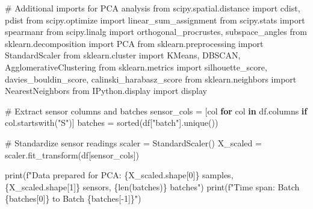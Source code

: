 \documentclass[
  letterpaper,
  DIV=11,
  numbers=noendperiod]{scrartcl}
\newenvironment{Shaded}{\begin{snugshade}}{\end{snugshade}}
\newcommand{\BuiltInTok}[1]{\textcolor[rgb]{0.00,0.23,0.31}{#1}}
\newcommand{\CommentTok}[1]{\textcolor[rgb]{0.37,0.37,0.37}{#1}}
\newcommand{\ControlFlowTok}[1]{\textcolor[rgb]{0.00,0.23,0.31}{\textbf{#1}}}
\newcommand{\DecValTok}[1]{\textcolor[rgb]{0.68,0.00,0.00}{#1}}
\newcommand{\ImportTok}[1]{\textcolor[rgb]{0.00,0.46,0.62}{#1}}
\newcommand{\KeywordTok}[1]{\textcolor[rgb]{0.00,0.23,0.31}{\textbf{#1}}}
\newcommand{\NormalTok}[1]{\textcolor[rgb]{0.00,0.23,0.31}{#1}}
\newcommand{\OperatorTok}[1]{\textcolor[rgb]{0.37,0.37,0.37}{#1}}
\newcommand{\SpecialCharTok}[1]{\textcolor[rgb]{0.37,0.37,0.37}{#1}}
\newcommand{\SpecialStringTok}[1]{\textcolor[rgb]{0.13,0.47,0.30}{#1}}
\newcommand{\StringTok}[1]{\textcolor[rgb]{0.13,0.47,0.30}{#1}}
\renewenvironment{Shaded}{%
  \begin{tcolorbox}[%
    enhanced,%
    colback=codebg,%
    colframe=codebg,%
    borderline west={3pt}{0pt}{sectionblue},%
    fontupper=\small\ttfamily,%
    boxrule=0pt,%
    arc=0pt,%
    boxsep=5pt,%
    left=2mm,%
    right=2mm,%
    top=2mm,%
    bottom=2mm%
  ]%
}{%
  \end{tcolorbox}%
}
\begin{document}
\begin{Shaded}
\begin{Highlighting}[]
\CommentTok{\# Additional imports for PCA analysis}
\ImportTok{from}\NormalTok{ scipy.spatial.distance }\ImportTok{import}\NormalTok{ cdist, pdist}
\ImportTok{from}\NormalTok{ scipy.optimize }\ImportTok{import}\NormalTok{ linear\_sum\_assignment}
\ImportTok{from}\NormalTok{ scipy.stats }\ImportTok{import}\NormalTok{ spearmanr}
\ImportTok{from}\NormalTok{ scipy.linalg }\ImportTok{import}\NormalTok{ orthogonal\_procrustes, subspace\_angles}
\ImportTok{from}\NormalTok{ sklearn.decomposition }\ImportTok{import}\NormalTok{ PCA}
\ImportTok{from}\NormalTok{ sklearn.preprocessing }\ImportTok{import}\NormalTok{ StandardScaler}
\ImportTok{from}\NormalTok{ sklearn.cluster }\ImportTok{import}\NormalTok{ KMeans, DBSCAN, AgglomerativeClustering}
\ImportTok{from}\NormalTok{ sklearn.metrics }\ImportTok{import}\NormalTok{ silhouette\_score, davies\_bouldin\_score, calinski\_harabasz\_score}
\ImportTok{from}\NormalTok{ sklearn.neighbors }\ImportTok{import}\NormalTok{ NearestNeighbors}
\ImportTok{from}\NormalTok{ IPython.display }\ImportTok{import}\NormalTok{ display}

\CommentTok{\# Extract sensor columns and batches}
\NormalTok{sensor\_cols }\OperatorTok{=}\NormalTok{ [col }\ControlFlowTok{for}\NormalTok{ col }\KeywordTok{in}\NormalTok{ df.columns }\ControlFlowTok{if}\NormalTok{ col.startswith(}\StringTok{"S"}\NormalTok{)]}
\NormalTok{batches }\OperatorTok{=} \BuiltInTok{sorted}\NormalTok{(df[}\StringTok{"batch"}\NormalTok{].unique())}

\CommentTok{\# Standardize sensor readings}
\NormalTok{scaler }\OperatorTok{=}\NormalTok{ StandardScaler()}
\NormalTok{X\_scaled }\OperatorTok{=}\NormalTok{ scaler.fit\_transform(df[sensor\_cols])}

\BuiltInTok{print}\NormalTok{(}\SpecialStringTok{f"Data prepared for PCA: }\SpecialCharTok{\{}\NormalTok{X\_scaled}\SpecialCharTok{.}\NormalTok{shape[}\DecValTok{0}\NormalTok{]}\SpecialCharTok{\}}\SpecialStringTok{ samples, }\SpecialCharTok{\{}\NormalTok{X\_scaled}\SpecialCharTok{.}\NormalTok{shape[}\DecValTok{1}\NormalTok{]}\SpecialCharTok{\}}\SpecialStringTok{ sensors, }\SpecialCharTok{\{}\BuiltInTok{len}\NormalTok{(batches)}\SpecialCharTok{\}}\SpecialStringTok{ batches"}\NormalTok{)}
\BuiltInTok{print}\NormalTok{(}\SpecialStringTok{f"Time span: Batch }\SpecialCharTok{\{}\NormalTok{batches[}\DecValTok{0}\NormalTok{]}\SpecialCharTok{\}}\SpecialStringTok{ to Batch }\SpecialCharTok{\{}\NormalTok{batches[}\OperatorTok{{-}}\DecValTok{1}\NormalTok{]}\SpecialCharTok{\}}\SpecialStringTok{"}\NormalTok{)}
\end{Highlighting}
\end{Shaded}
\end{document}
